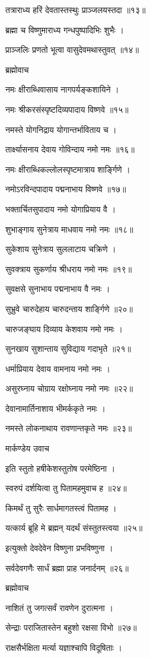तत्राराध्य हरिं देवतास्तस्थुः प्राञ्जलयस्तदा ॥१३॥

ब्रह्मा च विष्णुमाराध्य गन्धपुष्पादिभिः शुभैः ।

प्राञ्जलिः प्रणतो भूत्वा वासुदेवमथास्तुवत् ॥१४॥

ब्रह्मोवाच

नमः क्षीराब्धिवासाय नागपर्यङ्कशायिने ।

नमः श्रीकरसंस्पृष्टदिव्यपादाय विष्णवे ॥१५॥

नमस्ते योगनिद्राय योगान्तर्भाविताय च ।

तार्क्ष्यासनाय देवाय गोविन्दाय नमो नमः ॥१६॥

नमः क्षीराब्धिकल्लोलस्पृष्टमात्राय शार्ङ्गिणे ।

नमोऽरविन्दपादाय पद्मनाभाय विष्णवे ॥१७॥

भक्तार्चितसुपादाय नमो योगाप्रियाय वै ।

शुभाङ्गाय सुनेत्राय माधवाय नमो नमः ॥१८॥

सुकेशाय सुनेत्राय सुललाटाय चक्रिणे ।

सुवक्त्राय सुकर्णाय श्रीधराय नमो नमः ॥१९॥

सुवक्षसे सुनाभाय पद्मनाभाय वै नमः ।

सुभ्रुवे चारुदेहाय चारुदन्ताय शार्ङ्गिणे ॥२०॥

चारुजङ्घाय दिव्याय केशवाय नमो नमः ।

सुनखाय सुशान्ताय सुविद्याय गदाभृते ॥२१॥

धर्माप्रियाय देवाय वामनाय नमो नमः ।

असुरघ्नाय चोग्राय रक्षोघ्नाय नमो नमः ॥२२॥

देवानामार्तिनाशाय भीमर्ककृते नमः ।

नमस्ते लोकनाथाय रावणान्तकृते नमः ॥२३॥

मार्कण्डेय उवाच

इति स्तुतो हषीकेशस्तुतोष परमेष्ठिना ।

स्वरुपं दर्शयित्वा तु पितामहमुवाच ह ॥२४॥

किमर्थं तु सुरैः सार्धमागतस्त्वं पितामह ।

यत्कार्य ब्रूहि मे ब्रह्मन् यदर्थं संस्तुतस्त्वया ॥२५॥

इत्युक्तो देवदेवेन विष्णुना प्रभविष्णुना ।

सर्वदेवगणैः सार्धं ब्रह्मा प्राह जनार्दनम् ॥२६॥

ब्रह्मोवाच

नाशितं तु जगत्सर्वं रावणेन दुरात्मना ।

सेन्द्राः पराजितास्तेन बहुशो रक्षसा विभो ॥२७॥

राक्षसैर्भक्षिता मर्त्या यज्ञाश्चापि विदूषिताः ।

